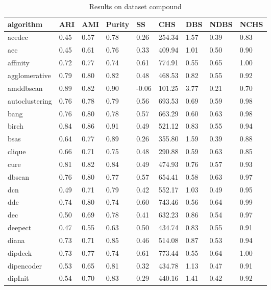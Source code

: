 \begin{table}[H]
\centering
\caption{Results on dataset compound}
\label{S60_Table}
\begin{tabular}{|l|l|l|l|l|l|l|l|l|}
\hline
algorithm & ARI & AMI & Purity & SS & CHS & DBS & NDBS & NCHS \\
\hline
acedec & 0.45 & 0.57 & 0.78 & 0.26 & 254.34 & 1.57 & 0.39 & 0.83 \\
\hline
aec & 0.45 & 0.61 & 0.76 & 0.33 & 409.94 & 1.01 & 0.50 & 0.90 \\
\hline
affinity & 0.72 & 0.77 & 0.74 & 0.61 & 774.91 & 0.55 & 0.65 & 1.00 \\
\hline
agglomerative & 0.79 & 0.80 & 0.82 & 0.48 & 468.53 & 0.82 & 0.55 & 0.92 \\
\hline
amddbscan & 0.89 & 0.82 & 0.90 & -0.06 & 101.25 & 3.77 & 0.21 & 0.70 \\
\hline
autoclustering & 0.76 & 0.78 & 0.79 & 0.56 & 693.53 & 0.69 & 0.59 & 0.98 \\
\hline
bang & 0.76 & 0.80 & 0.78 & 0.57 & 663.29 & 0.60 & 0.63 & 0.98 \\
\hline
birch & 0.84 & 0.86 & 0.91 & 0.49 & 521.12 & 0.83 & 0.55 & 0.94 \\
\hline
bsas & 0.64 & 0.77 & 0.89 & 0.26 & 355.80 & 1.59 & 0.39 & 0.88 \\
\hline
clique & 0.66 & 0.71 & 0.75 & 0.48 & 290.88 & 0.59 & 0.63 & 0.85 \\
\hline
cure & 0.81 & 0.82 & 0.84 & 0.49 & 474.93 & 0.76 & 0.57 & 0.93 \\
\hline
dbscan & 0.76 & 0.80 & 0.77 & 0.57 & 654.41 & 0.58 & 0.63 & 0.97 \\
\hline
dcn & 0.49 & 0.71 & 0.79 & 0.42 & 552.17 & 1.03 & 0.49 & 0.95 \\
\hline
ddc & 0.74 & 0.80 & 0.74 & 0.60 & 743.46 & 0.56 & 0.64 & 0.99 \\
\hline
dec & 0.50 & 0.69 & 0.78 & 0.41 & 632.23 & 0.86 & 0.54 & 0.97 \\
\hline
deepect & 0.47 & 0.55 & 0.63 & 0.50 & 434.74 & 0.83 & 0.55 & 0.91 \\
\hline
diana & 0.73 & 0.71 & 0.85 & 0.46 & 514.08 & 0.87 & 0.53 & 0.94 \\
\hline
dipdeck & 0.73 & 0.77 & 0.74 & 0.61 & 773.44 & 0.55 & 0.64 & 1.00 \\
\hline
dipencoder & 0.53 & 0.65 & 0.81 & 0.32 & 434.78 & 1.13 & 0.47 & 0.91 \\
\hline
dipInit & 0.54 & 0.70 & 0.83 & 0.29 & 440.16 & 1.41 & 0.42 & 0.92 \\

\end{tabular}
\end{table}

